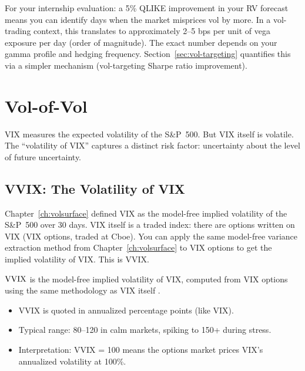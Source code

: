 \begin{projectconnection}
For your internship evaluation: a 5\% QLIKE improvement in your RV forecast means you can identify days when the market misprices vol by more.
In a vol-trading context, this translates to approximately 2--5 bps per unit of vega exposure per day (order of magnitude).
The exact number depends on your gamma profile and hedging frequency.
Section~\ref{sec:vol-targeting} quantifies this via a simpler mechanism (vol-targeting Sharpe ratio improvement).
\end{projectconnection}


\section{Vol-of-Vol}
\label{sec:vvix}

VIX measures the expected volatility of the S\&P~500.
But VIX itself is volatile.
The ``volatility of VIX'' captures a distinct risk factor: uncertainty about the level of future uncertainty.

\subsection{VVIX: The Volatility of VIX}

\begin{prereq}
Chapter~\ref{ch:volsurface} defined VIX as the model-free implied volatility of the S\&P~500 over 30 days.
VIX itself is a traded index: there are options written on VIX (VIX options, traded at Cboe).
You can apply the same model-free variance extraction method from Chapter~\ref{ch:volsurface} to VIX options to get the implied volatility of VIX.
This is VVIX.
\end{prereq}

\begin{definition}[VVIX]
\label{def:vvix}
$\operatorname{VVIX}$ is the model-free implied volatility of VIX, computed from VIX options using the same methodology as VIX itself \citep{CBOE2019}.
\begin{itemize}[nosep]
  \item VVIX is quoted in annualized percentage points (like VIX).
  \item Typical range: 80--120 in calm markets, spiking to 150+ during stress.
  \item Interpretation: VVIX = 100 means the options market prices VIX's annualized volatility at 100\%.
\end{itemize}
\end{definition}

